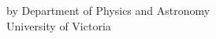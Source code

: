 \pagebreak
{
\centering
\thesistitle
\tpbreak
by
\tpbreak
\nameanddegrees
\tpbreak
Department of Physics and Astronomy\\
University of Victoria
\tpbreak
}
\vfill
\pagebreak
